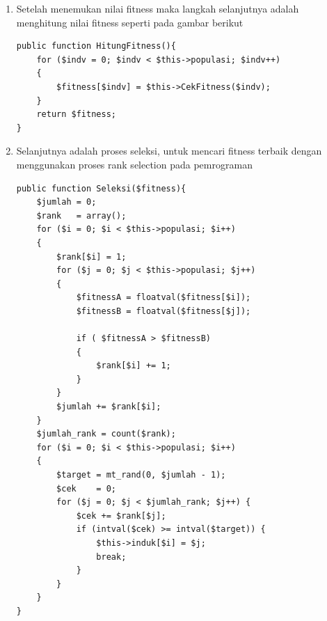 \begin{enumerate}
	\item Setelah menemukan nilai fitness maka langkah selanjutnya adalah menghitung nilai fitness seperti pada gambar berikut
\begin{lstlisting}
public function HitungFitness(){        
    for ($indv = 0; $indv < $this->populasi; $indv++)
    {            
        $fitness[$indv] = $this->CekFitness($indv);            
    }
    return $fitness;
}
\end{lstlisting}
		
	\item Selanjutnya adalah proses seleksi, untuk mencari fitness terbaik dengan menggunakan proses rank selection pada pemrograman
\begin{lstlisting}
public function Seleksi($fitness){
    $jumlah = 0;
    $rank   = array();
    for ($i = 0; $i < $this->populasi; $i++)
    {
        $rank[$i] = 1;
        for ($j = 0; $j < $this->populasi; $j++)
        {
            $fitnessA = floatval($fitness[$i]);
            $fitnessB = floatval($fitness[$j]);
            
            if ( $fitnessA > $fitnessB)
            {
                $rank[$i] += 1;                    
            }
        }
        $jumlah += $rank[$i];
    }
    $jumlah_rank = count($rank);
    for ($i = 0; $i < $this->populasi; $i++)
    {
        $target = mt_rand(0, $jumlah - 1);           
        $cek    = 0;
        for ($j = 0; $j < $jumlah_rank; $j++) {
            $cek += $rank[$j];
            if (intval($cek) >= intval($target)) {
                $this->induk[$i] = $j;
                break;
            }
        }
    }
}
\end{lstlisting}
		

\end{enumerate}
